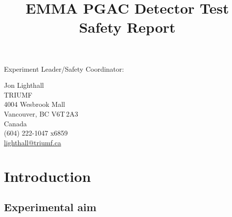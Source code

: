 \title{EMMA PGAC Detector Test\\ Safety Report}
\author{}
\date{}
\maketitle
\noindent Experiment Leader/Safety Coordinator:
\begin{changemargin}{\parindent}
\noindent Jon Lighthall\\
TRIUMF\\
4004 Wesbrook Mall\\
Vancouver, BC V6T\,2A3\\
Canada\\
{(604) 222-1047 x6859}\\%
\href{mailto:lighthall@triumf.ca}{lighthall@triumf.ca}\\
\end{changemargin}
\pagestyle{fancy}
\lhead{}
\renewcommand{\headrulewidth}{0pt}
\section{Introduction}
\subsection{Experimental aim}

